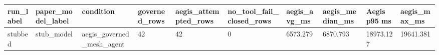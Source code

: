 \begin{tabular}{llllllllll}
 \hline
run\_label & paper\_model\_label & condition & governed\_rows & aegis\_attempted\_rows & no\_tool\_fail\_closed\_rows & aegis\_avg\_ms & aegis\_median\_ms & Aegis p95 ms & aegis\_max\_ms \\
 \hline
stubbed & stub\_model & aegis\_governed\_mesh\_agent & 42 & 42 & 0 & 6573.279 & 6870.793 & 18973.127 & 19641.381 \\
 \hline
\end{tabular}
